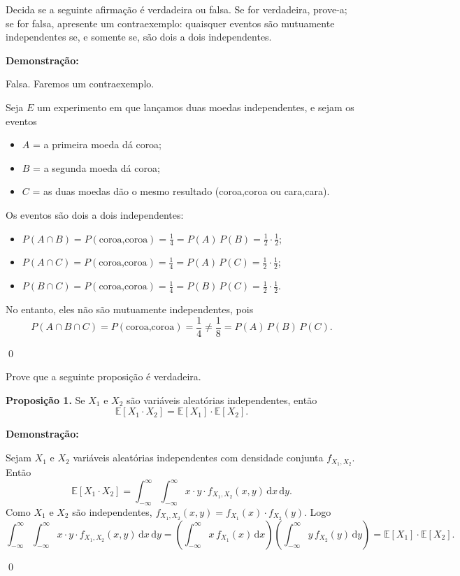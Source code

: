 \documentclass[12pt]{article}
\newenvironment{problem}[2][Exercício]{\begin{trivlist}
\item[\hskip \labelsep {\bfseries #1}\hskip \labelsep {\bfseries #2.}]}{\end{trivlist}}
\newenvironment{sol}
    {\textbf{Demonstração:}\emph{}
    }
    {
    \qed
    }
\begin{document}
\begin{problem}{8}
    Decida se a seguinte afirmação é verdadeira ou falsa. Se for verdadeira, prove-a; se for falsa, apresente um contraexemplo: quaisquer eventos são mutuamente independentes se, e somente se, são dois a dois independentes.
\end{problem}
\begin{sol}
    Falsa. Faremos um contraexemplo.

    Seja $E$ um experimento em que lançamos duas moedas independentes, e sejam os eventos
    \begin{itemize}
        \item $A$ = a primeira moeda dá coroa;
        \item $B$ = a segunda moeda dá coroa;
        \item $C$ = as duas moedas dão o mesmo resultado (coroa,coroa ou cara,cara).
    \end{itemize}

    Os eventos são dois a dois independentes:
    \begin{itemize}
        \item $P(A\cap B) = P(\text{coroa,coroa}) = \frac{1}{4} = P(A)\,P(B) = \frac{1}{2}\cdot\frac{1}{2}$;
        \item $P(A\cap C) = P(\text{coroa,coroa}) = \frac{1}{4} = P(A)\,P(C) = \frac{1}{2}\cdot\frac{1}{2}$;
        \item $P(B\cap C) = P(\text{coroa,coroa}) = \frac{1}{4} = P(B)\,P(C) = \frac{1}{2}\cdot\frac{1}{2}$.
    \end{itemize}

    No entanto, eles não são mutuamente independentes, pois
    \[
        P(A\cap B\cap C) = P(\text{coroa,coroa}) = \frac{1}{4}
        \neq \frac{1}{8} = P(A)\,P(B)\,P(C).
    \]
\end{sol}

\begin{problem}{9}
    Prove que a seguinte proposição é verdadeira.
    
    \textbf{Proposição 1.} Se $X_1$ e $X_2$ são variáveis aleatórias independentes, então
    \[
        \mathbb{E}[X_1 \cdot X_2] = \mathbb{E}[X_1] \cdot \mathbb{E}[X_2].
    \]
\end{problem}
\begin{sol}
    Sejam $X_1$ e $X_2$ variáveis aleatórias independentes com densidade conjunta $f_{X_1,X_2}$.
    Então
    \[
        \mathbb{E}[X_1 \cdot X_2] = \int_{-\infty}^{\infty}\int_{-\infty}^{\infty} x\cdot y \cdot f_{X_1,X_2}(x,y)\,\mathrm{d}x\,\mathrm{d}y.
    \]
    Como $X_1$ e $X_2$ são independentes, $f_{X_1,X_2}(x,y) = f_{X_1}(x)\cdot f_{X_2}(y)$. Logo
    \[
        \int_{-\infty}^{\infty}\int_{-\infty}^{\infty} x\cdot y \cdot f_{X_1,X_2}(x,y)\,\mathrm{d}x\,\mathrm{d}y
        = \left(\int_{-\infty}^{\infty} x\, f_{X_1}(x)\,\mathrm{d}x\right)
          \left(\int_{-\infty}^{\infty} y\, f_{X_2}(y)\,\mathrm{d}y\right)
        = \mathbb{E}[X_1]\cdot\mathbb{E}[X_2].
    \]
\end{sol}
\end{document}
